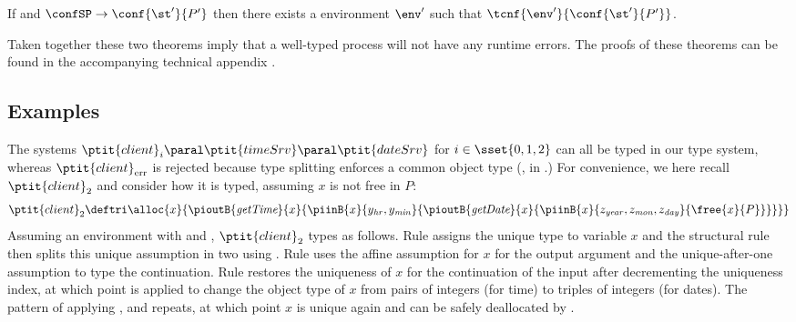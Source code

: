 \documentclass[copyright]{eptcs}
\begin{document}
\begin{theorem}
If \tcnf{\env}{\confSP} and $\confSP \rightarrow
\conf{\st'}{P'}$ then there exists a environment $\env'$ such that 
$\tcnf{\env'}{\conf{\st'}{P'}}$.   
\end{theorem}

\noindent
Taken together these two theorems imply that a well-typed process will not have
any runtime errors. The proofs of these theorems can be found in the
accompanying technical appendix \cite{devries:linearity-appendix}.

\subsection{Examples}

The systems $\ptit{client}_i \paral \ptit{timeSrv} \paral \ptit{dateSrv}$ for
$i\in \sset{0,1,2}$ can all be typed in our type system, whereas
$\ptit{client}_\text{err}$ is rejected because type splitting enforces a common
object type (\cf {},  in .) For
convenience, we here recall $\ptit{client}_2$  and consider how it is typed,
assuming $x$ is not free in $P$: 
\begin{equation*}
  \ptit{client}_2 \deftri \alloc{x}{\pioutB{\textit{getTime}}{x}{\piinB{x}{y_\mathit{hr}, y_\mathit{min}}{\pioutB{\textit{getDate}}{x}{\piinB{x}{z_\mathit{year}, z_\mathit{mon}, z_\mathit{day}}{\free{x}{P}}}}}}
\end{equation*}
Assuming an environment with
and
,
$\ptit{client}_2$ types as follows.  Rule  assigns the unique type
 to variable $x$ and the
structural rule  then splits this unique assumption in two using
. Rule  uses the affine assumption for $x$ for the output
argument and the unique-after-one assumption to type the continuation.  Rule
 restores the uniqueness of $x$ for the continuation of the input
after decrementing the uniqueness index, at which point  is applied
to change the object type of $x$ from pairs of integers (for time) to triples
of integers (for dates). The pattern of applying ,  and
 repeats, at which point $x$ is unique again and can be safely
deallocated by . 
\end{document}
